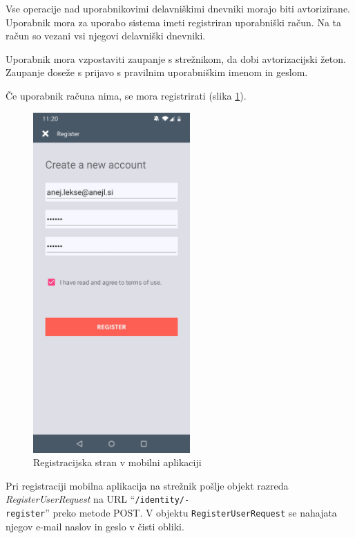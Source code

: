 \documentclass[a4paper, 12pt]{book}
\begin{document}
Vse operacije nad uporabnikovimi delavniškimi dnevniki morajo biti avtorizirane.
Uporabnik mora za uporabo sistema imeti registriran uporabniški račun.
Na ta račun so vezani vsi njegovi delavniški dnevniki.

Uporabnik mora vzpostaviti zaupanje s strežnikom, da dobi avtorizacijski žeton.
Zaupanje doseže s prijavo s pravilnim uporabniškim imenom in geslom.


Če uporabnik računa nima, se mora registrirati (slika \ref{app_register}).

\begin{figure}[H]
\begin{center}
\includegraphics[width=6cm]{app_register}
\end{center}
	\caption{Registracijska stran v mobilni aplikaciji}
\label{app_register}
\end{figure}

Pri registraciji mobilna aplikacija na strežnik pošlje objekt razreda \textit{RegisterUserRequest} na URL \enquote{\texttt{/identity/-\\register}} preko metode POST.
V objektu \texttt{RegisterUserRequest} se nahajata njegov e-mail naslov in geslo v čisti obliki.
\end{document}
